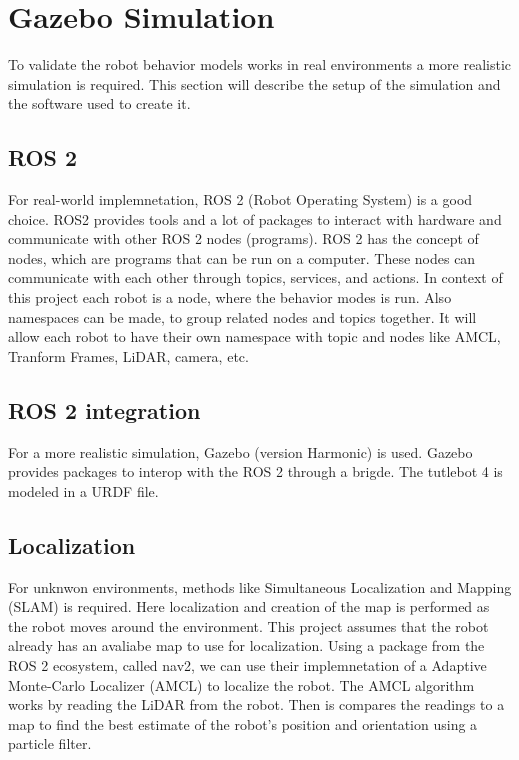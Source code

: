 \section{Gazebo Simulation}
To validate the robot behavior models works in real environments a more realistic simulation is required.
This section will describe the setup of the simulation and the software used to create it.

\subsection{ROS 2}\label{sub:ros_2}
For real-world implemnetation, ROS 2 (Robot Operating System) is a good choice. ROS2 provides tools and a lot of packages to interact with hardware and communicate with other 
ROS 2 nodes (programs).
ROS 2 has the concept of nodes, which are programs that can be run on a computer. These nodes can communicate with each other through topics, services, and actions.
In context of this project each robot is a node, where the behavior modes is run. Also namespaces can be made, to group related nodes and topics together. 
It will allow each robot to have their own namespace with topic and nodes like AMCL, Tranform Frames, LiDAR, camera, etc.

\subsection{ROS 2 integration}\label{sub:ros_2_integration}
For a more realistic simulation, Gazebo (version Harmonic) is used. Gazebo provides packages to interop with the ROS 2 through a brigde.
The tutlebot 4 is modeled in a URDF file.

\subsection{Localization}\label{sub:localization} 
For unknwon environments, methods like Simultaneous Localization and Mapping (SLAM) is required. Here localization and creation of the map is performed
as the robot moves around the environment.
This project assumes that the robot already has an avaliabe map to use for localization. 
Using a package from the ROS 2 ecosystem, called nav2, we can use their implemnetation of a Adaptive Monte-Carlo Localizer (AMCL) to localize the robot.
The AMCL algorithm works by reading the LiDAR from the robot. Then is compares the readings to a map to find the best estimate of the robot's position and orientation using a particle filter.

